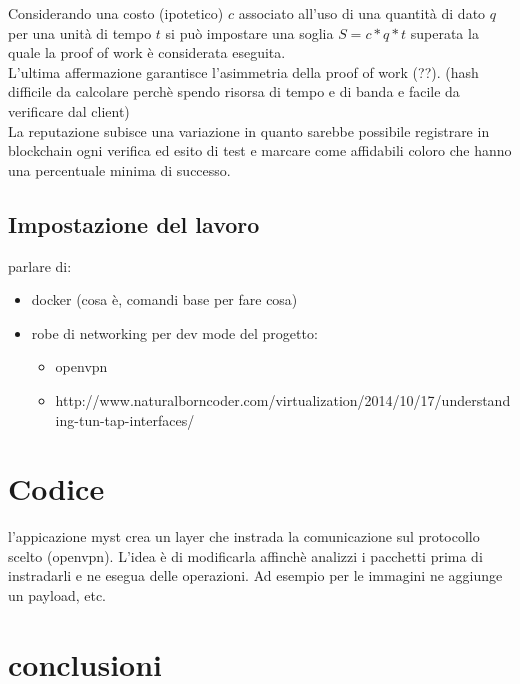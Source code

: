 \documentclass[]{article}
\begin{document}
			
			Considerando una costo (ipotetico) $c$ associato all'uso di una quantità di dato $q$ per una unità di tempo $t$ si può impostare una soglia $S = c*q*t$ superata la quale la proof of work è considerata eseguita.\\
			L'ultima affermazione garantisce l'asimmetria della proof of work (??). (hash difficile da calcolare perchè spendo risorsa di tempo e di banda e facile da verificare dal client)\\
			
			La reputazione subisce una variazione in quanto sarebbe possibile registrare in blockchain ogni verifica ed esito di test e marcare come affidabili coloro che hanno una percentuale minima di successo.\\

	\subsection{Impostazione del lavoro}
	parlare di:
	\begin{itemize}
		\item docker (cosa è, comandi base per fare cosa)
		\item robe di networking per dev mode del progetto:
		\begin{itemize}
			\item openvpn
			\item http://www.naturalborncoder.com/virtualization/2014/10/17/understanding-tun-tap-interfaces/
		
		\end{itemize}
	\end{itemize}
	
	\section{Codice}
	l'appicazione myst crea un layer che instrada la comunicazione sul protocollo scelto (openvpn). L'idea è di modificarla affinchè analizzi i pacchetti prima di instradarli e ne esegua delle operazioni. Ad esempio per le immagini ne aggiunge un payload, etc.\\
	
	
	
	\section{conclusioni}
	
	
\end{document}
